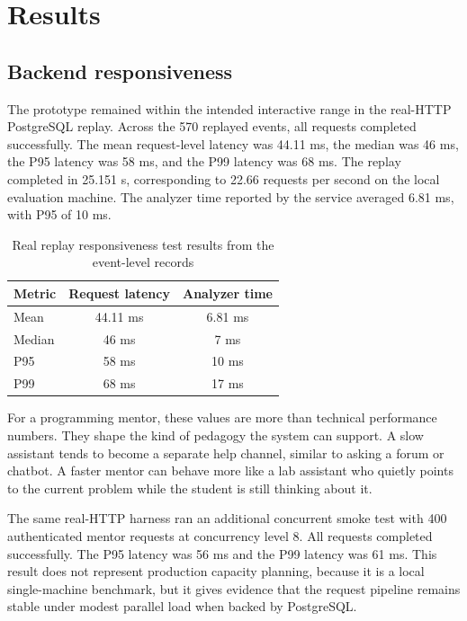\documentclass[11pt]{article}
\begin{document}
\section{Results}

\subsection{Backend responsiveness}

The prototype remained within the intended interactive range in the real-HTTP PostgreSQL replay. Across the 570 replayed events, all requests completed successfully. The mean request-level latency was 44.11 ms, the median was 46 ms, the P95 latency was 58 ms, and the P99 latency was 68 ms. The replay completed in 25.151 s, corresponding to 22.66 requests per second on the local evaluation machine. The analyzer time reported by the service averaged 6.81 ms, with P95 of 10 ms.

\begin{table}[htbp]
\centering
\caption{Real replay responsiveness test results from the event-level records}
\label{tab:latency_results}
\renewcommand{\arraystretch}{1.15}
\begin{tabular}{lcc}
\toprule
\textbf{Metric} & \textbf{Request latency} & \textbf{Analyzer time} \\
\midrule
Mean & 44.11 ms & 6.81 ms \\
Median & 46 ms & 7 ms \\
P95 & 58 ms & 10 ms \\
P99 & 68 ms & 17 ms \\
\bottomrule
\end{tabular}
\end{table}

For a programming mentor, these values are more than technical performance numbers. They shape the kind of pedagogy the system can support. A slow assistant tends to become a separate help channel, similar to asking a forum or chatbot. A faster mentor can behave more like a lab assistant who quietly points to the current problem while the student is still thinking about it.

The same real-HTTP harness ran an additional concurrent smoke test with 400 authenticated mentor requests at concurrency level 8. All requests completed successfully. The P95 latency was 56 ms and the P99 latency was 61 ms. This result does not represent production capacity planning, because it is a local single-machine benchmark, but it gives evidence that the request pipeline remains stable under modest parallel load when backed by PostgreSQL.
\end{document}
